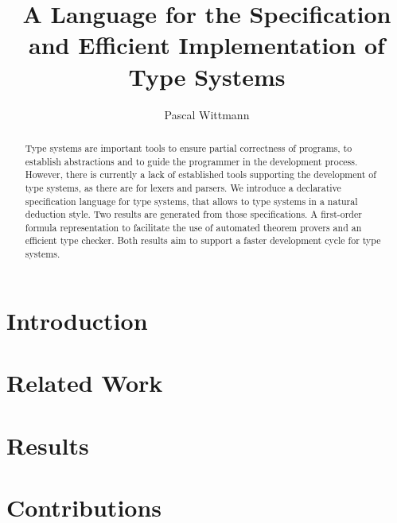 \documentclass{acm_proc_article-sp}
\begin{document}
\title{A Language for the Specification and Efficient Implementation
  of Type Systems}


\author{
\alignauthor
Pascal Wittmann
}

\maketitle

\begin{abstract}
  Type systems are important tools to ensure partial correctness of
  programs, to establish abstractions and to guide the programmer in
  the development process. However, there is currently a lack of
  established tools supporting the development of type systems, as
  there are for lexers and parsers. We introduce a declarative
  specification language for type systems, that allows to type systems
  in a natural deduction style. Two results are generated from those
  specifications. A first-order formula representation to facilitate
  the use of automated theorem provers and an efficient type
  checker. Both results aim to support a faster development cycle for
  type systems.
 \end{abstract}

\section{Introduction}
\section{Related Work}
\section{Results}
\section{Contributions}
\end{document}
